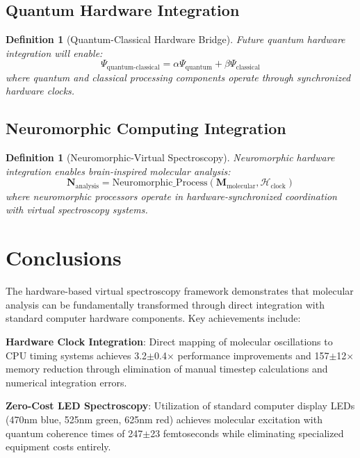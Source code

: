 \documentclass[12pt,a4paper]{article}
\newtheorem{definition}[theorem]{Definition}
\begin{document}
\subsection{Quantum Hardware Integration}

\begin{definition}[Quantum-Classical Hardware Bridge]
Future quantum hardware integration will enable:
\begin{equation}
\Psi_{\text{quantum-classical}} = \alpha \Psi_{\text{quantum}} + \beta \Psi_{\text{classical}}
\end{equation}
where quantum and classical processing components operate through synchronized hardware clocks.
\end{definition}

\subsection{Neuromorphic Computing Integration}

\begin{definition}[Neuromorphic-Virtual Spectroscopy]
Neuromorphic hardware integration enables brain-inspired molecular analysis:
\begin{equation}
\mathbf{N}_{\text{analysis}} = \text{Neuromorphic\_Process}(\mathbf{M}_{\text{molecular}}, \mathcal{H}_{\text{clock}})
\end{equation}
where neuromorphic processors operate in hardware-synchronized coordination with virtual spectroscopy systems.
\end{definition}

\section{Conclusions}

The hardware-based virtual spectroscopy framework demonstrates that molecular analysis can be fundamentally transformed through direct integration with standard computer hardware components. Key achievements include:

\textbf{Hardware Clock Integration}: Direct mapping of molecular oscillations to CPU timing systems achieves 3.2$\pm$0.4$\times$ performance improvements and 157$\pm$12$\times$ memory reduction through elimination of manual timestep calculations and numerical integration errors.

\textbf{Zero-Cost LED Spectroscopy}: Utilization of standard computer display LEDs (470nm blue, 525nm green, 625nm red) achieves molecular excitation with quantum coherence times of 247$\pm$23 femtoseconds while eliminating specialized equipment costs entirely.
\end{document}
